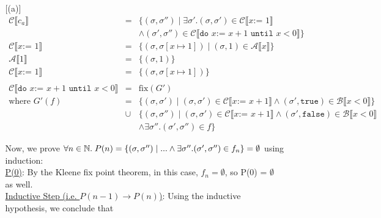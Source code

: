 \documentclass[10pt, oneside]{article}
\begin{document}
\begin{enumerate}[1.]
\begin{enumerate} [(a)]
      \begin{eqnarray*}
        \mathcal{C} \llbracket c_a \rrbracket & = & 
          \{(\sigma, \sigma'') \mid \exists \sigma'. 
            (\sigma, \sigma') \in \mathcal{C}\llbracket x\texttt{:= } 1\rrbracket \\
     & & \wedge (\sigma', \sigma'') \in \mathcal{C} \llbracket \texttt{do } x 
                               \texttt{:= } x + 1 \texttt{ until } x < 0 \rrbracket
                                   \} \\
        \mathcal{C} \llbracket x \texttt{:= }1 \rrbracket & = & \{ (\sigma, \sigma[x \mapsto 1]) \mid (\sigma, 1) \in \mathcal{A} \llbracket x \rrbracket  \} \\
        \mathcal{A} \llbracket 1 \rrbracket & = & \{(\sigma, 1) \} \\
        \mathcal{C} \llbracket x \texttt{:= } 1 \rrbracket & = & \{ (\sigma, \sigma[x \mapsto 1]) \} \\
        & & \\
        \mathcal{C} \llbracket \texttt{do } x \texttt{:= } x + 1 \texttt{ until } x < 0 \rrbracket & = & \text{fix}(G') \\
        \text{where } G'(f) & = & \{ (\sigma, \sigma') \mid (\sigma, \sigma') \in \mathcal{C} \llbracket x \texttt{:= } x + 1 \rrbracket \wedge (\sigma', \texttt{true}) \in \mathcal{B} \llbracket x < 0 \rrbracket \} \\
				& \cup & \{ (\sigma, \sigma'') \mid (\sigma, \sigma')  \in \mathcal{C} \llbracket x \texttt{:= } x + 1 \rrbracket \wedge (\sigma', \texttt{false})\in \mathcal{B} \llbracket x < 0 \rrbracket \\
				& & \wedge \exists \sigma''. (\sigma', \sigma'') \in f \}
      \end{eqnarray*}
      
      Now, we prove $\forall n \in \mathbb{N}. \hspace{1mm}
      P(n) = \{ (\sigma, \sigma'') \mid ... \wedge \exists \sigma''. (\sigma', 
      \sigma'') \in f_n \} = \emptyset$ using induction: \\
      
      \underline{P(0)}: By the Kleene fix point theorem, in this case, $f_n = \emptyset$, so P(0) = $\emptyset$ as well.  \\    
      \underline{Inductive Step (i.e. $P(n - 1) \rightarrow P(n)$)}: Using the 
      inductive hypothesis, we conclude that 
      

\end{enumerate}
\end{enumerate}
\end{document}
